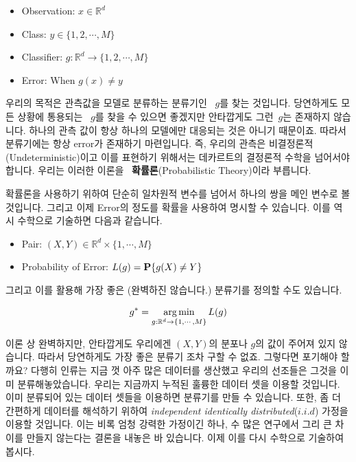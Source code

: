 \documentclass[final]{IEEEphot}
\begin{document}
\begin{itemize}
    \item Observation: $x \in \mathbb{R}^d$
    \item Class: $y \in \{1,2,\cdots,M\}$
    \item Classifier: $g: \mathbb{R}^d \rightarrow \{1,2,\cdots,M\}$
    \item Error: When $g(x) \neq y$
\end{itemize}

\HS 우리의 목적은 관측값을 모델로 분류하는 분류기인  $g$​를 찾는 것입니다. 
당연하게도 모든 상황에 통용되는  $g$​를 찾을 수 있으면 좋겠지만 안타깝게도 그런 ​ $g$​는 존재하지 않습니다. 
하나의 관측 값이 항상 하나의 모델에만 대응되는 것은 아니기 때문이죠. 따라서 분류기에는 항상 error가 존재하기 마련입니다. 
즉, 우리의 관측은 비결정론적(Undeterministic)이고 이를 표현하기 위해서는 데카르트의 결정론적 수학을 넘어서야 합니다. 
우리는 이러한 이론을  \textbf{확률론}(Probabilistic Theory)이라 부릅니다.

\VS

\HS 확률론을 사용하기 위하여 단순히 일차원적 변수를 넘어서 하나의 쌍을 메인 변수로 볼 것입니다. 
그리고 이제 Error의 정도를 확률을 사용하여 명시할 수 있습니다. 이를 역시 수학으로 기술하면 다음과 같습니다.

\begin{itemize}
    \item Pair: $(X,Y) \in \mathbb{R}^d \times \{1,\cdots,M\}$
    \item Probability of Error: $L(g) = \P\{g(X)\neq Y\}$
\end{itemize}

그리고 이를 활용해 가장 좋은 (완벽하진 않습니다.) 분류기를 정의할 수도 있습니다.

\begin{equation}
    g^* = \argmin_{g:\mathbb{R}^d \rightarrow \{1,\cdots,M\}} L(g)
\end{equation}

이론 상 완벽하지만, 안타깝게도 우리에겐 $(X,Y)$의 분포나 $g$의 값이 주어져 있지 않습니다.
따라서 당연하게도 가장 좋은 분류기 조차 구할 수 없죠. 그렇다면 포기해야 할까요?
다행히 인류는 지금 껏 아주 많은 데이터를 생산했고 우리의 선조들은 그것을 이미 분류해놓았습니다.
우리는 지금까지 누적된 훌륭한 데이터 셋을 이용할 것입니다. 이미 분류되어 있는 데이터 셋들을 이용하면 분류기를 만들 수 있습니다. 또한, 좀 더 간편하게 데이터를 해석하기 위하여 \textit{independent identically distributed}($i.i.d$) 가정을 이용할 것입니다. 이는 비록 엄청 강력한 가정이긴 하나, 수 많은 연구에서 그리 큰 차이를 만들지 않는다는 결론을 내놓은 바 있습니다.
이제 이를 다시 수학으로 기술하여 봅시다.
\end{document}
